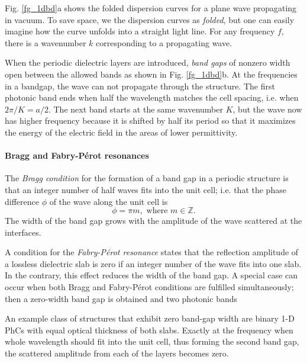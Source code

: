 Fig. \ref{fg_1dbd}a shows the folded dispersion curves for a plane wave propagating in vacuum.
To save space, we the dispersion curves as \textit{folded}, but one can easily imagine how the curve unfolds into a straight light line. For any frequency $f$, there is a wavenumber $k$ corresponding to a propagating wave. 

When the periodic dielectric layers are introduced, \textit{band gaps} of nonzero width open between the allowed bands as shown in Fig. \ref{fg_1dbd}b. 
At the frequencies in a bandgap, the wave can not propagate through the structure. The first photonic band ends when half the wavelength matches the cell spacing, i.e. when $2\pi / K= a/2$. The next band starts at the same wavenumber $K$, but the wave now has higher frequency because it is shifted by half its period so that it maximizes the energy of the electric field in the areas of lower permittivity. 


\paragraph{Bragg and Fabry-Pérot resonances}
The \textit{Bragg condition} for the formation of a band gap in a periodic structure is that an integer number of half waves fits into the unit cell; i.e. that the phase difference $\phi$ of the wave along the unit cell is 
\begin{equation} \phi = \pi m, \text{ where } m\in \mathbb{Z}. \label{eq_braggcond}\end{equation}
The width of the band gap grows with the amplitude of the wave scattered at the interfaces.

A condition for the \textit{Fabry-Pérot resonance} states that the reflection amplitude of a lossless dielectric slab is zero if an integer number of the wave fits into one slab. In the contrary, this effect reduces the width of the band gap. A special case can occur when both Bragg and Fabry-Pérot conditions are fulfilled simultaneously; then a zero-width band gap is obtained and two photonic bands 

An example class of structures that exhibit zero band-gap width are binary 1-D PhCs with equal optical thickness of both slabs. Exactly at the frequency when whole wavelength should fit into the unit cell, thus forming the second band gap, the scattered amplitude from each of the layers becomes zero.

